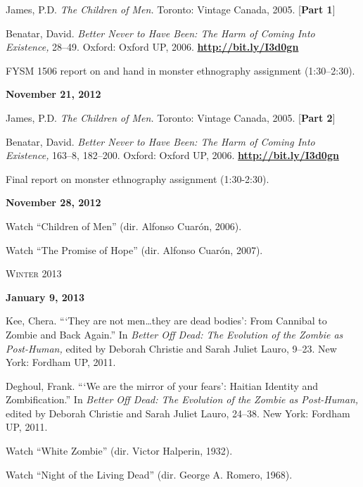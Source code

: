 \documentclass[12pt]{article}
\begin{document}
\begin{hangparas}{.5in}{1}
James, P.D. \textit{The Children of Men.} Toronto: Vintage Canada, 2005. [\textbf{Part 1}]

Benatar, David. \textit{Better Never to Have Been: The Harm of Coming Into Existence,} 28--49. Oxford: Oxford UP, 2006. \href{http://bit.ly/I3d0gn}{\textbf{http://bit.ly/I3d0gn}}

FYSM 1506 report on and hand in monster ethnography assignment (1:30--2:30).
\end{hangparas}

\textbf{November 21, 2012}

\begin{hangparas}{.5in}{1}
James, P.D. \textit{The Children of Men.} Toronto: Vintage Canada, 2005. [\textbf{Part 2}]

Benatar, David. \textit{Better Never to Have Been: The Harm of Coming Into Existence,} 163--8, 182--200. Oxford: Oxford UP, 2006. \href{http://bit.ly/I3d0gn}{\textbf{http://bit.ly/I3d0gn}}
\end{hangparas}

Final report on monster ethnography assignment (1:30-2:30).

\textbf{November 28, 2012}

Watch ``Children of Men'' (dir. Alfonso Cuar\'on, 2006).

Watch ``The Promise of Hope'' (dir. Alfonso Cuar\'on, 2007).

\vspace{.125in}

\begin{center}
{\Large \textsc{Winter 2013}}
\end{center}

\vspace{.125in}


\textbf{January 9, 2013}

\begin{hangparas}{.5in}{1}
Kee, Chera. ```They are not men\ldots they are dead bodies': From Cannibal to Zombie and Back Again.'' In \textit{Better Off Dead: The Evolution of the Zombie as Post-Human,} edited by Deborah Christie and Sarah Juliet Lauro, 9--23. New York: Fordham UP, 2011. 

Deghoul, Frank. ```We are the mirror of your fears': Haitian Identity and Zombification.'' In \textit{Better Off Dead: The Evolution of the Zombie as Post-Human,} edited by Deborah Christie and Sarah Juliet Lauro, 24--38. New York: Fordham UP, 2011. 

Watch ``White Zombie'' (dir. Victor Halperin, 1932).

Watch ``Night of the Living Dead'' (dir. George A. Romero, 1968).
\end{hangparas}
\end{document}
